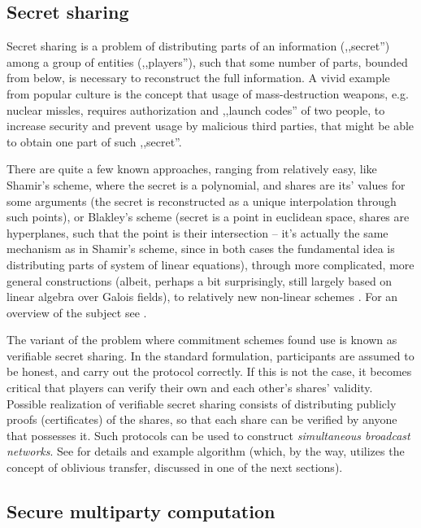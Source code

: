 \documentclass[10pt]{article}
\begin{document}
\subsection{Secret sharing}

Secret sharing is a problem of distributing parts of an information (,,secret'') among a group of
entities (,,players''), such that some number of parts, bounded from below, is necessary to 
reconstruct the full information. A vivid example from popular culture is the concept that usage
of mass-destruction weapons, e.g. nuclear missles, requires authorization and ,,launch codes'' of
two people, to increase security and prevent usage by malicious third parties, that might be able
to obtain one part of such ,,secret''.

There are quite a few known approaches, ranging from relatively easy, like Shamir's scheme, where
the secret is a polynomial, and shares are its' values for some arguments (the secret is reconstructed
as a unique interpolation through such points), or Blakley's scheme (secret is a point in euclidean
space, shares are hyperplanes, such that the point is their intersection -- it's actually the same
mechanism as in Shamir's scheme, since in both cases the fundamental idea is distributing parts of
system of linear equations), through more complicated, more general constructions (albeit, perhaps
a bit surprisingly, still largely based on linear algebra over Galois fields), to relatively new 
non-linear schemes \cite{Beimel01onthe}. For an overview of the subject see \cite{SharingSurvey}.

The variant of the problem where commitment schemes found use is known as verifiable secret sharing.
In the standard formulation, participants are assumed to be honest, and carry out the protocol correctly.
If this is not the case, it becomes critical that players can verify their own and each other's shares'
validity. Possible realization of verifiable secret sharing consists of distributing publicly proofs
(certificates) of the shares, so that each share can be verified by anyone that possesses it. Such
protocols can be used to construct \emph{simultaneous broadcast networks}. See \cite{VerifiableSharing}
for details and example algorithm (which, by the way, utilizes the concept of oblivious transfer,
discussed in one of the next sections).

\subsection{Secure multiparty computation}
\end{document}
